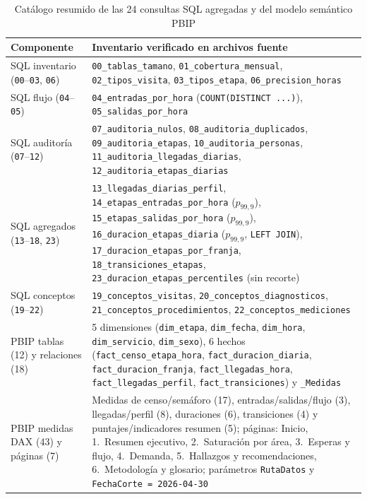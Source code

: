 \begin{table}[htbp]
\caption{Catálogo resumido de las 24 consultas SQL agregadas y del modelo semántico PBIP}
\label{tab:anexo_sql_pbip}
{\singlespacing\small
\begin{tabularx}{\textwidth}{@{}L{0.25\textwidth} Y@{}}
\toprule
Componente & Inventario verificado en archivos fuente \\
\midrule
SQL inventario (\texttt{00}--\texttt{03}, \texttt{06}) & \texttt{00\_tablas\_tamano}, \texttt{01\_cobertura\_mensual}, \texttt{02\_tipos\_visita}, \texttt{03\_tipos\_etapa}, \texttt{06\_precision\_horas} \\
SQL flujo (\texttt{04}--\texttt{05}) & \texttt{04\_entradas\_por\_hora} (\texttt{COUNT(DISTINCT ...)}), \texttt{05\_salidas\_por\_hora} \\
SQL auditoría (\texttt{07}--\texttt{12}) & \texttt{07\_auditoria\_nulos}, \texttt{08\_auditoria\_duplicados}, \texttt{09\_auditoria\_etapas}, \texttt{10\_auditoria\_personas}, \texttt{11\_auditoria\_llegadas\_diarias}, \texttt{12\_auditoria\_etapas\_diarias} \\
SQL agregados (\texttt{13}--\texttt{18}, \texttt{23}) & \texttt{13\_llegadas\_diarias\_perfil}, \texttt{14\_etapas\_entradas\_por\_hora} ($p_{99{,}9}$), \texttt{15\_etapas\_salidas\_por\_hora} ($p_{99{,}9}$), \texttt{16\_duracion\_etapas\_diaria} ($p_{99{,}9}$, \texttt{LEFT JOIN}), \texttt{17\_duracion\_etapas\_por\_franja}, \texttt{18\_transiciones\_etapas}, \texttt{23\_duracion\_etapas\_percentiles} (sin recorte) \\
SQL conceptos (\texttt{19}--\texttt{22}) & \texttt{19\_conceptos\_visitas}, \texttt{20\_conceptos\_diagnosticos}, \texttt{21\_conceptos\_procedimientos}, \texttt{22\_conceptos\_mediciones} \\
\midrule
PBIP tablas (12) y relaciones (18) & 5 dimensiones (\texttt{dim\_etapa}, \texttt{dim\_fecha}, \texttt{dim\_hora}, \texttt{dim\_servicio}, \texttt{dim\_sexo}), 6 hechos (\texttt{fact\_censo\_etapa\_hora}, \texttt{fact\_duracion\_diaria}, \texttt{fact\_duracion\_franja}, \texttt{fact\_llegadas\_hora}, \texttt{fact\_llegadas\_perfil}, \texttt{fact\_transiciones}) y \texttt{\_Medidas} \\
PBIP medidas DAX (43) y páginas (7) & Medidas de censo/semáforo (17), entradas/salidas/flujo (3), llegadas/perfil (8), duraciones (6), transiciones (4) y puntajes/indicadores resumen (5); páginas: Inicio, 1.~Resumen ejecutivo, 2.~Saturación por área, 3.~Esperas y flujo, 4.~Demanda, 5.~Hallazgos y recomendaciones, 6.~Metodología y glosario; parámetros \texttt{RutaDatos} y \texttt{FechaCorte = 2026-04-30} \\
\bottomrule
\end{tabularx}}
\end{table}


